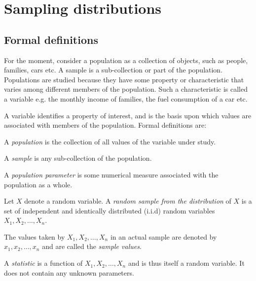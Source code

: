 \documentclass[12pt]{article}
\newenvironment{definition}[1][Definition:]{\begin{trivlist}
\item[\hskip \labelsep {\bfseries #1}]}{\end{trivlist}}
\begin{document}
\newpage
\section{Sampling distributions}
\subsection{Formal definitions}
For the moment, consider a population as a collection of objects, such as people, families, cars etc.  A sample is a sub-collection or part of the population.  Populations are studied because they have some property or characteristic that varies among different members of the population.  Such a characteristic is called a variable e.g. the monthly income of families, the fuel consumption of a car etc.

A variable identifies a property of interest, and is the basis upon which values are associated with members of the population.  Formal definitions are:
\begin{definition}
A \emph{population} is the collection of all values of the variable under study.
\end{definition}
\begin{definition}
A \emph{sample} is any sub-collection of the population.
\end{definition}
\begin{definition}
A \emph{population parameter} is some numerical measure associated with the population as a whole.
\end{definition}
\begin{definition}
Let $X$ denote a random variable. A \emph{random sample from the distribution} of $X$   is a set of independent and identically distributed (i.i.d) random variables $X_{1},X_{2},\ldots,X_{n}$.
\end{definition}
\begin{definition}
The values taken by $X_{1},X_{2},\ldots,X_{n}$ in an actual sample are denoted by $x_{1},x_{2},\ldots,x_{n}$ and are called the \emph{sample values}.
\end{definition}
\begin{definition}
A \emph{statistic} is a function of $X_{1},X_{2},\ldots,X_{n}$  and is thus itself a random variable.  It does not contain any unknown parameters.
\end{definition}
\end{document}

